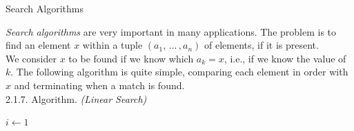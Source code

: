 \documentclass[smaller,hyperref={CJKbookmarks=true}]{beamer}
\newcounter{zhuo}[subsection]
\begin{document}
\begin{frame}[t]{Search Algorithms}
\begin{spacing}{1}
\emph{Search algorithms} are very important in many applications. The problem is to find an element $x$ within a tuple $(a_1,\,...\,,a_n)$ of elements, if it is present.\\[5pt]
We consider $x$ to be found if we know which $a_k=x$, i.e., if we know the value of $k$. The following algorithm is quite simple, comparing each element in order with $x$ and terminating when a match is found.\\[4pt]
\alert{2.1.7. Algorithm.} \emph{(Linear Search)}
\IncMargin{1em}
\begin{algorithm}[H]
$i\leftarrow1$\;
\end{algorithm}\DecMargin{1em}
\end{spacing}
\end{frame}
\end{document}
